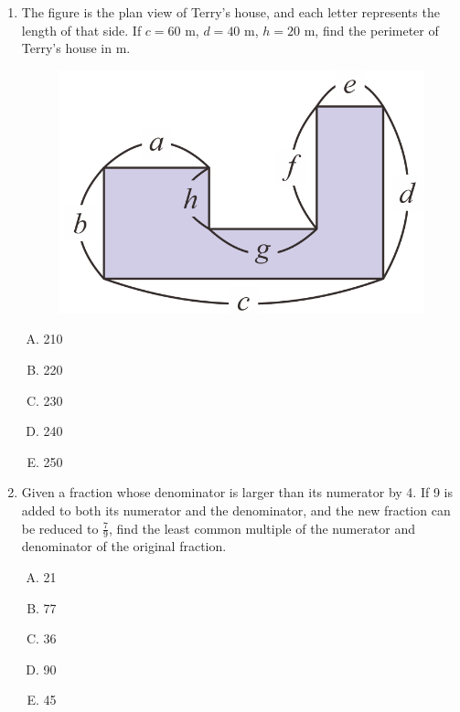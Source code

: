\documentclass[12pt]{scrartcl}
\begin{document}
\begin{enumerate}
    \item The figure is the plan view of Terry's house, and each letter represents the length of that side. If $c = 60$ m, $d = 40$ m, $h = 20$ m, find the perimeter of Terry's house in m.
    \begin{figure}[h]
        \centering
        \includegraphics[scale=0.4]{StarGen/0Figure/wmi2023G6A-num3.png}
    \end{figure}
    \begin{multicols}{5}
        \begin{enumerate}[(A)]
            \item 210
            \item 220
            \item 230
            \item 240
            \item 250
        \end{enumerate}
    \end{multicols} \hrulefill

    \item Given a fraction whose denominator is larger than its numerator by 4. If 9 is added to both its numerator and the denominator, and the new fraction can be reduced to $\frac{7}{9}$, find the least common multiple of the numerator and denominator of the original fraction.
    \begin{multicols}{5}
        \begin{enumerate}[(A)]
            \item 21
            \item 77
            \item 36
            \item 90
            \item 45
        \end{enumerate}
    \end{multicols} \hrulefill


\end{enumerate}
\end{document}
